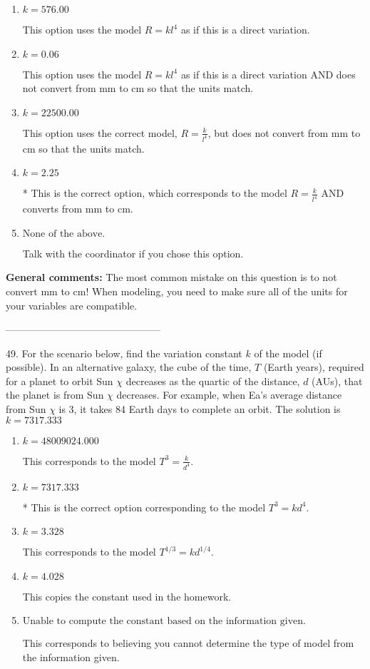 \documentclass{extbook}[14pt]
\begin{document}
\begin{enumerate}[label=\Alph*.] 
\item $ k = 576.00 $ 

 This option uses the model $R = kl^{4}$ as if this is a direct variation. 
\item $ k = 0.06 $ 

 This option uses the model $R = kl^{4}$ as if this is a direct variation AND does not convert from mm to cm so that the units match. 
\item $ k = 22500.00 $ 

 This option uses the correct model, $R = \frac{k}{l^{4}}$, but does not convert from mm to cm so that the units match. 
\item $ k = 2.25 $ 

 * This is the correct option, which corresponds to the model $R = \frac{k}{l^{4}}$ AND converts from mm to cm. 
\item $ \text{None of the above.} $ 

 Talk with the coordinator if you chose this option. 
\end{enumerate} 
 
\textbf{General comments:} The most common mistake on this question is to not convert mm to cm! When modeling, you need to make sure all of the units for your variables are compatible.

-----------------------------------------------

49. For the scenario below, find the variation constant $k$ of the model (if possible).
In an alternative galaxy, the cube of the time, $T$ (Earth years), required for a planet to orbit Sun $\chi$ decreases as the quartic of the distance, $d$ (AUs), that the planet is from Sun $\chi$ decreases. For example, when Ea's average distance from Sun $\chi$ is 3, it takes 84 Earth days to complete an orbit. 
The solution is $ k = 7317.333 $ 

\begin{enumerate}[label=\Alph*.] 
\item $ k = 48009024.000 $ 

 This corresponds to the model $T^{3} = \frac{k}{d^{4}}$. 
\item $ k = 7317.333 $ 

 * This is the correct option corresponding to the model $T^{3} = k d^{4}$. 
\item $ k = 3.328 $ 

 This corresponds to the model $T^{1/3} = k d^{1/4}$. 
\item $ k = 4.028 $ 

 This copies the constant used in the homework. 
\item $ \text{Unable to compute the constant based on the information given.} $ 

 This corresponds to believing you cannot determine the type of model from the information given. 
\end{enumerate} 
 
\end{document}
